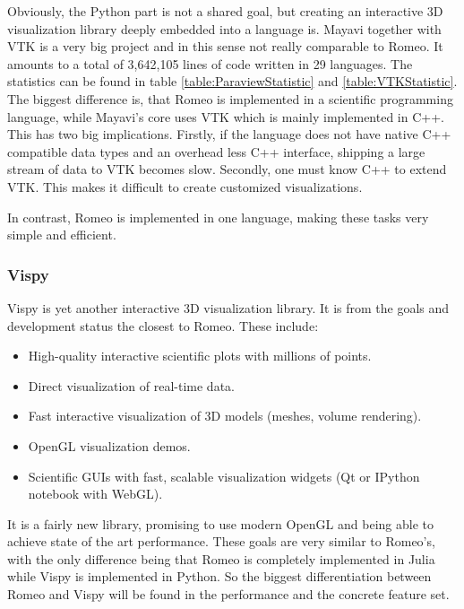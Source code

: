 Obviously, the Python part is not a shared goal, but creating an interactive 3D visualization library deeply embedded into a language is.
Mayavi together with VTK is a very big project and in this sense not really comparable to Romeo.
It amounts to a total of 3,642,105 lines of code written in 29 languages. The statistics can be found in table \ref{table:ParaviewStatistic} and \ref{table:VTKStatistic}.
The biggest difference is, that Romeo is implemented in a scientific programming language, while Mayavi's core uses VTK which is mainly implemented in C++.
This has two big implications.
Firstly, if the language does not have native C++ compatible data types and an overhead less C++ interface, shipping a large stream of data to VTK becomes slow.
Secondly, one must know C++ to extend VTK. This makes it difficult to create customized visualizations.

In contrast, Romeo is implemented in one language, making these tasks very simple and efficient.


\subsubsection{Vispy}

Vispy is yet another interactive 3D visualization library. It is from the goals and development status the closest to Romeo.
These include\cite{VispyGoals}:

\begin{itemize}
	\item High-quality interactive scientific plots with millions of points.
	\item Direct visualization of real-time data.
	\item Fast interactive visualization of 3D models (meshes, volume rendering).
	\item OpenGL visualization demos.
	\item Scientific GUIs with fast, scalable visualization widgets (Qt or IPython notebook with WebGL).
\end{itemize}

It is a fairly new library, promising to use modern OpenGL and being able to achieve state of the art performance.
These goals are very similar to Romeo's, with the only difference being that Romeo is completely implemented in Julia while Vispy is implemented in Python.
So the biggest differentiation between Romeo and Vispy will be found in the performance and the concrete feature set.
